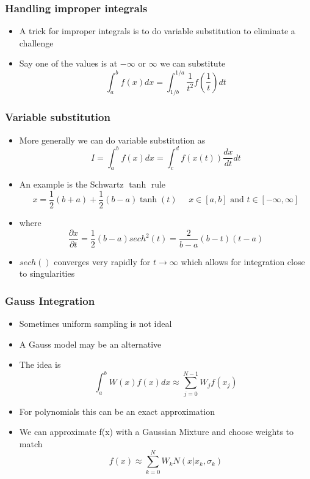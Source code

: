 \documentclass[10pt]{beamer}
\begin{document}
\begin{frame}
  \frametitle{Handling improper integrals}
  \begin{itemize}
  \item A trick for improper integrals is to do variable substitution to eliminate a challenge
  \item Say one of the values is at $-\infty$ or $\infty$ we can substitute
    \[
      \int_a^b f(x) dx = \int_{1/b}^{1/a} \frac{1}{t^2} f\left( \frac{1}{t} \right) dt
    \]
  \end{itemize}
\end{frame}

\begin{frame}
  \frametitle{Variable substitution}
  \begin{itemize}
  \item More generally we can do variable substitution as
    \[
      I = \int_a^b f(x) dx = \int_c^d f(x(t)) \frac{dx}{dt} dt
    \]
  \item An example is the Schwartz $\tanh$ rule
    \[
      x = \frac{1}{2} (b+a) + \frac{1}{2} (b-a) \tanh(t) \mbox{~~~ } x\in[a,b] \mbox{ and } t\in[-\infty,\infty]
    \]
  \item where
    \[
      \frac{\partial x}{\partial t} = \frac{1}{2} (b-a) sech^2(t) = \frac{2}{b-a} (b-t) (t-a)
    \]
  \item $sech()$ converges very rapidly for $t\rightarrow \infty$ which allows for integration close to singularities
  \end{itemize}
\end{frame}

\begin{frame}
  \frametitle{Gauss Integration}
  \begin{itemize}
  \item Sometimes uniform sampling is not ideal
  \item A Gauss model may be an alternative
  \item The idea is
    \[
      \int_a^b W(x) f(x) dx \approx \sum_{j=0}^{N-1} W_j f(x_j)
    \]
  \item For polynomials this can be an exact approximation
  \item We can approximate f(x) with a Gaussian Mixture and choose weights to match
    \[
      f(x) \approx \sum_{k=0}^N W_k N(x | x_k, \sigma_k)
    \]
  \end{itemize}
\end{frame}
\end{document}
